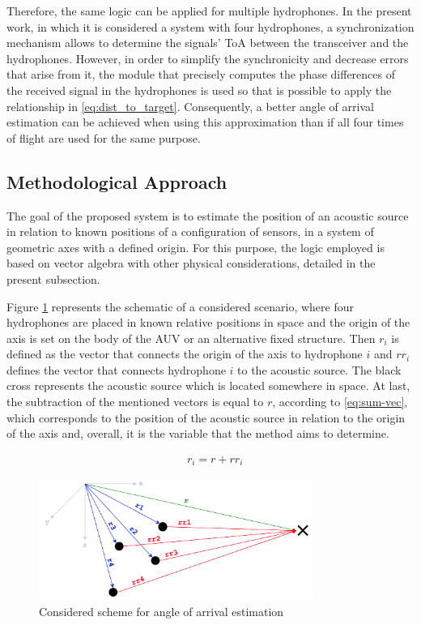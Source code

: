 Therefore, the same logic can be applied for multiple hydrophones. In the present work, in which it is considered a system with four hydrophones, a synchronization mechanism allows to determine the signals' ToA between the transceiver and the hydrophones. However, in order to simplify the synchronicity and decrease errors that arise from it, the module that precisely computes the phase differences of the received signal in the hydrophones is used so that is possible to apply the relationship in \ref{eq:dist_to_target}. Consequently, a better angle of arrival estimation can be achieved when using this approximation than if all four times of flight are used for the same purpose.

\subsection{Methodological Approach}

The goal of the proposed system is to estimate the position of an acoustic source in relation to known positions of a configuration of sensors, in a system of geometric axes with a defined origin. For this purpose, the logic employed is based on vector algebra with other physical considerations, detailed in the present subsection. 

Figure \ref{fig:AoA-init} represents the schematic of a considered scenario, where four hydrophones are placed in known relative positions in space and the origin of the axis is set on the body of the AUV or an alternative fixed structure. Then $r_i$ is defined as the vector that connects the origin of the axis to hydrophone $i$ and $rr_i$ defines the vector that connects hydrophone $i$ to the acoustic source. The black cross represents the acoustic source which is located somewhere in space. At last, the subtraction of the mentioned vectors is equal to $r$, according to \ref{eq:sum-vec}, which corresponds to the position of the acoustic source in relation to the origin of the axis and, overall, it is the variable that the method aims to determine.

\begin{eqnarray}
& r_i = r + rr_i
\label{eq:sum-vec}
\end{eqnarray}

\begin{figure}[!htbp]
	\centering
	\includegraphics[width=0.8\textwidth]{figures/AoA-init}
	\captionsetup{justification=centering,margin=2cm}
	\caption{Considered scheme for angle of arrival estimation}
	\label{fig:AoA-init}
\end{figure}

